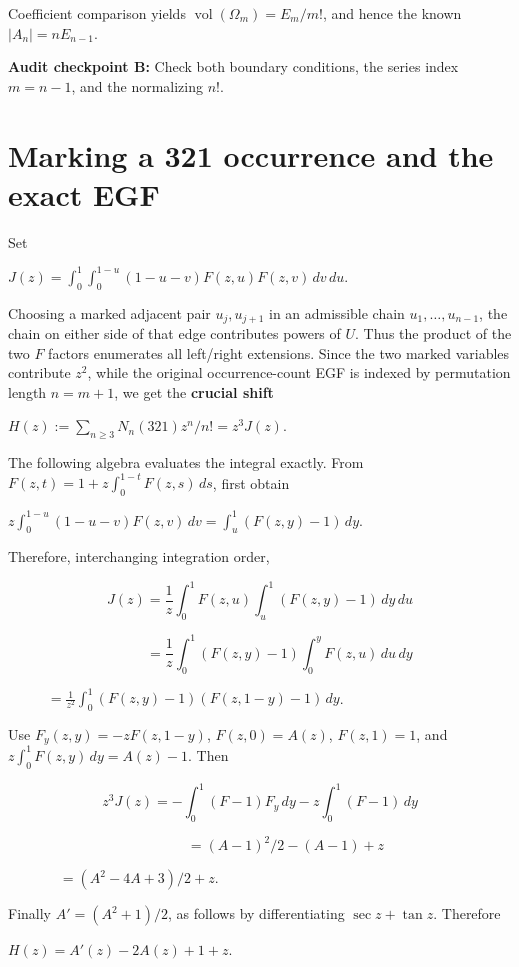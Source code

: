 \documentclass[
  11pt,
]{article}
\let\oldsection\section
\renewcommand{\section}{\needspace{5\baselineskip}\oldsection}
\begin{document}
Coefficient comparison yields \(\operatorname{vol}(\Omega_m)=E_m/m!\),
and hence the known \(|A_n|=nE_{n-1}\).

\textbf{Audit checkpoint B:} Check both boundary conditions, the series
index \(m=n-1\), and the normalizing \(n!\).

\section{Marking a 321 occurrence and the exact
EGF}\label{marking-a-321-occurrence-and-the-exact-egf}

Set

\(J(z)=\int_0^1\int_0^{1-u}(1-u-v)F(z,u)F(z,v)\,dv\,du\).

Choosing a marked adjacent pair \(u_j,u_{j+1}\) in an admissible chain
\(u_1,\ldots,u_{n-1}\), the chain on either side of that edge
contributes powers of \(U\). Thus the product of the two \(F\) factors
enumerates all left/right extensions. Since the two marked variables
contribute \(z^2\), while the original occurrence-count EGF is indexed
by permutation length \(n=m+1\), we get the \textbf{crucial shift}

\(H(z):=\sum_{n\geq3}N_n(321)z^n/n!=z^3J(z)\).

The following algebra evaluates the integral exactly. From
\(F(z,t)=1+z\int_0^{1-t}F(z,s)\,ds\), first obtain

\(z\int_0^{1-u}(1-u-v)F(z,v)\,dv=\int_u^1(F(z,y)-1)\,dy\).

Therefore, interchanging integration order,

\[J(z)=\frac1z\int_0^1F(z,u)\int_u^1(F(z,y)-1)\,dy\,du\]

\[\phantom{J(z)}=\frac1z\int_0^1(F(z,y)-1)\int_0^y F(z,u)\,du\,dy\]

\(\phantom{J(z)}=\frac1{z^2}\int_0^1(F(z,y)-1)(F(z,1-y)-1)\,dy\).

Use \(F_y(z,y)=-z F(z,1-y)\), \(F(z,0)=A(z)\), \(F(z,1)=1\), and
\(z\int_0^1F(z,y)\,dy=A(z)-1\). Then

\[z^3J(z)=-\int_0^1(F-1)F_y\,dy-z\int_0^1(F-1)\,dy\]

\[\phantom{z^3J(z)}=(A-1)^2/2-(A-1)+z\]

\(\phantom{z^3J(z)}=(A^2-4A+3)/2+z\).

Finally \(A'=(A^2+1)/2\), as follows by differentiating
\(\sec z+\tan z\). Therefore

\(H(z)=A'(z)-2A(z)+1+z\).

\end{document}
